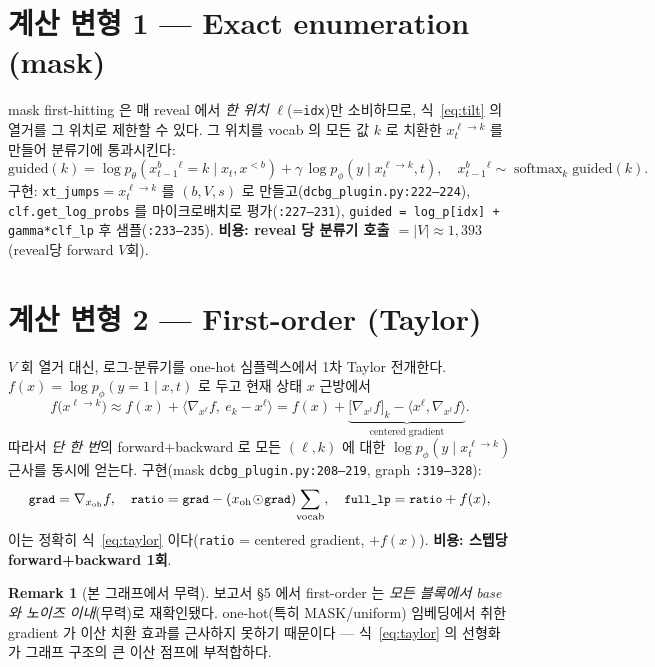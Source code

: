 \documentclass[11pt]{article}
\newcommand{\code}[1]{\texttt{\small #1}}
\newcommand{\xpre}{x^{<b}}
\newcommand{\xblk}{x^{b}}
\newcommand{\pth}{p_\theta}
\newcommand{\pphi}{p_\phi}
\DeclareMathOperator{\softmax}{softmax}
\theoremstyle{plain}
\theoremstyle{definition}
\newtheorem{remark}{Remark}
\begin{document}
\section{계산 변형 1 — Exact enumeration (mask)}
mask first-hitting 은 매 reveal 에서 \emph{한 위치} $\ell$(=\code{idx})만 소비하므로,
식~\eqref{eq:tilt} 의 열거를 그 위치로 제한할 수 있다.
그 위치를 vocab 의 모든 값 $k$ 로 치환한 $x_t^{\ell\to k}$ 를 만들어 분류기에 통과시킨다:
\begin{equation}
\text{guided}(k)=\log\pth(\xblk_{t-1}{}^{\ell}=k\mid x_t,\xpre)+\gamma\,\log\pphi(y\mid x_t^{\ell\to k},t),
\quad \xblk_{t-1}{}^{\ell}\sim\softmax_k \text{guided}(k).
\end{equation}
구현: \code{xt\_jumps}$=x_t^{\ell\to k}$ 를 $(b,V,s)$ 로 만들고(\code{dcbg\_plugin.py:222--224}),
\code{clf.get\_log\_probs} 를 마이크로배치로 평가(\code{:227--231}),
\code{guided = log\_p[idx] + gamma*clf\_lp} 후 샘플(\code{:233--235}).
\textbf{비용: reveal 당 분류기 호출 $=|V|\approx1{,}393$}(reveal당 forward $V$회).

\section{계산 변형 2 — First-order (Taylor)}
$V$ 회 열거 대신, 로그-분류기를 one-hot 심플렉스에서 1차 Taylor 전개한다.
$f(x)=\log\pphi(y{=}1\mid x,t)$ 로 두고 현재 상태 $x$ 근방에서
\begin{equation}
f\big(x^{\ell\to k}\big)\approx f(x)+\big\langle \nabla_{x^{\ell}}f,\ e_k-x^{\ell}\big\rangle
= f(x)+\underbrace{\big[\nabla_{x^{\ell}}f\big]_k-\big\langle x^{\ell},\nabla_{x^{\ell}}f\big\rangle}_{\text{centered gradient}}.
\label{eq:taylor}
\end{equation}
따라서 \emph{단 한 번}의 forward+backward 로 모든 $(\ell,k)$ 에 대한
$\log\pphi(y\mid x_t^{\ell\to k})$ 근사를 동시에 얻는다.
구현(mask \code{dcbg\_plugin.py:208--219}, graph \code{:319--328}):
\begin{equation}
\code{grad}=\nabla_{x_{\text{oh}}}f,\quad
\code{ratio}=\code{grad}-(x_{\text{oh}}\!\odot\!\code{grad})\!\sum_{\text{vocab}},\quad
\code{full\_lp}=\code{ratio}+f(x),
\end{equation}
이는 정확히 식~\eqref{eq:taylor} 이다(\code{ratio} = centered gradient, $+f(x)$).
\textbf{비용: 스텝당 forward+backward 1회}.
\begin{remark}[본 그래프에서 무력]
보고서 §5 에서 first-order 는 \emph{모든 블록에서 base 와 노이즈 이내}(무력)로 재확인됐다.
one-hot(특히 MASK/uniform) 임베딩에서 취한 gradient 가 이산 치환 효과를 근사하지 못하기 때문이다
— 식~\eqref{eq:taylor} 의 선형화가 그래프 구조의 큰 이산 점프에 부적합하다.
\end{remark}
\end{document}
